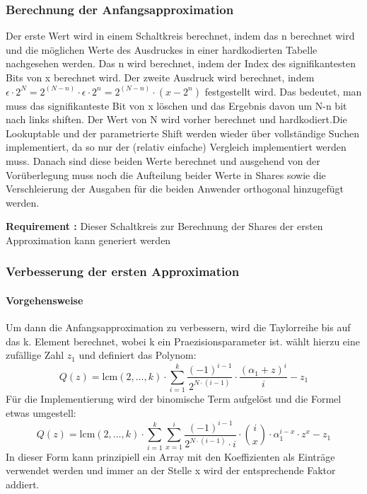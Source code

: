 \documentclass{article}
\newcounter{requirementscount}{}
\newcommand{\requirement}[1] {
        \addtocounter{requirementscount}{1}
        {\bf Requirement \therequirementscount:} #1\\
    }
\begin{document}
\subsubsection{Berechnung der Anfangsapproximation}
Der erste Wert wird in einem Schaltkreis berechnet, indem das n berechnet wird
und die m\"oglichen Werte des Ausdruckes in einer hardkodierten Tabelle
nachgesehen werden. Das n wird berechnet, indem der Index des signifikantesten
Bits von x berechnet wird. Der zweite Ausdruck wird berechnet, indem 
\(\epsilon \cdot 2^N = 2^(N-n) \cdot \epsilon \cdot 2^n = 2^(N-n) \cdot (x - 2^n)\) 
festgestellt wird. Das bedeutet, man muss das signifikanteste Bit von x 
l\"oschen und das Ergebnis davon um N-n bit nach links shiften. Der Wert
von N wird vorher berechnet und hardkodiert.Die Lookuptable und der 
parametrierte Shift werden wieder \"uber vollst\"andige Suchen implementiert,
da so nur der (relativ einfache) Vergleich implementiert werden muss.
Danach sind diese beiden Werte berechnet und ausgehend von der Vor\"uberlegung
muss noch die Aufteilung beider Werte in Shares sowie die Verschleierung der
Ausgaben f\"ur die beiden Anwender orthogonal hinzugef\"ugt werden.\\
\requirement{Dieser Schaltkreis zur Berechnung der Shares der
ersten Approximation kann generiert werden}

\subsubsection{Verbesserung der ersten Approximation}
\paragraph{Vorgehensweise}
Um dann die Anfangsapproximation zu verbessern, wird die Taylorreihe bis auf
das k. Element berechnet, wobei k ein Praezisionsparameter ist. 
\cite{privateid3} w\"ahlt hierzu eine zuf\"allige Zahl \(z_1\) und definiert
das Polynom:
\begin{equation}
Q(z) = 
    \mathrm{lcm}(2,\dots,k)
    \cdot
    \sum_{i=1}^k 
    \frac{(-1)^{i-1}}{2^{N \cdot (i-1)}}
    \cdot
    \frac{(\alpha_1+z)^i}{i}
    - z_1
\end{equation}
F\"ur die Implementierung wird der binomische Term aufgel\"ost und die Formel
etwas umgestell:
\begin{equation}
Q(z) =
    \mathrm{lcm}(2, \dots, k)
    \cdot
    \sum
        _{
            i=1
        }
        ^k
    \sum
        _{
            x=1
        }
        ^i
    \frac
        {
            (-1)
                ^{
                    i-1
                }
        }
        {
            2
                ^{
                    N \cdot (i-1)
                }
            \cdot 
            i
        }
    \cdot
    {i \choose x}
    \cdot
    \alpha_1
        ^{i-x}
    \cdot
    z
        ^x
    - z_1
\end{equation}
In dieser Form kann prinzipiell ein Array mit den Koeffizienten als Eintr\"age
verwendet werden und immer an der Stelle x wird der entsprechende Faktor
addiert.
\end{document}
